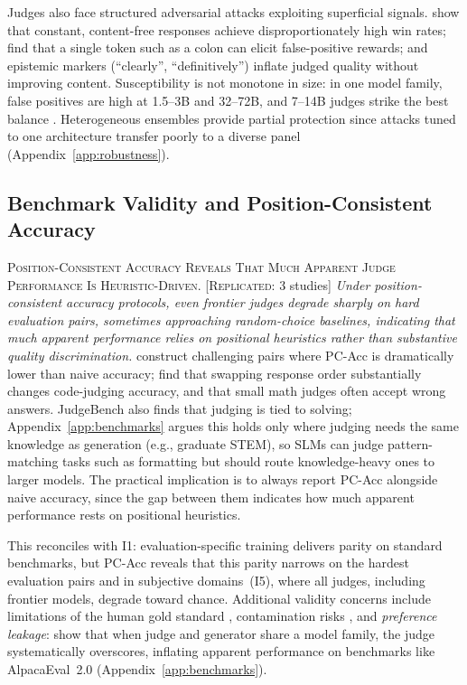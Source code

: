 \documentclass[11pt]{article}
\begin{document}
Judges also face structured adversarial attacks exploiting superficial signals. \citet{zheng2025cheating} show that constant, content-free responses achieve disproportionately high win rates; \citet{zhao2025one} find that a single token such as a colon can elicit false-positive rewards; and epistemic markers (``clearly'', ``definitively'') inflate judged quality without improving content. Susceptibility is not monotone in size: in one model family, false positives are high at 1.5--3B and 32--72B, and 7--14B judges strike the best balance \citep{zhao2025one}. Heterogeneous ensembles provide partial protection since attacks tuned to one architecture transfer poorly to a diverse panel (Appendix~\ref{app:robustness}).

\subsection{Benchmark Validity and Position-Consistent Accuracy}

\textsc{Position-Consistent Accuracy Reveals That Much Apparent Judge Performance Is Heuristic-Driven.} [\textsc{Replicated}: 3 studies] \textit{Under position-consistent accuracy protocols, even frontier judges degrade sharply on hard evaluation pairs, sometimes approaching random-choice baselines, indicating that much apparent performance relies on positional heuristics rather than substantive quality discrimination.} \citet{tan2025judgebench} construct challenging pairs where PC-Acc is dramatically lower than naive accuracy; \citet{jiang2025codejudgebench} find that swapping response order substantially changes code-judging accuracy, and \citet{bi2026judgeboard} that small math judges often accept wrong answers. JudgeBench also finds that judging is tied to solving; Appendix~\ref{app:benchmarks} argues this holds only where judging needs the same knowledge as generation (e.g., graduate STEM), so SLMs can judge pattern-matching tasks such as formatting but should route knowledge-heavy ones to larger models. The practical implication is to always report PC-Acc alongside naive accuracy, since the gap between them indicates how much apparent performance rests on positional heuristics.

This reconciles with I1: evaluation-specific training delivers parity on standard benchmarks, but PC-Acc reveals that this parity narrows on the hardest evaluation pairs and in subjective domains~(I5), where all judges, including frontier models, degrade toward chance. Additional validity concerns include limitations of the human gold standard \citep{shankar2024validates}, contamination risks \citep{bedemariam2025potential}, and \emph{preference leakage}: \citet{li2025preference} show that when judge and generator share a model family, the judge systematically overscores, inflating apparent performance on benchmarks like AlpacaEval~2.0 (Appendix~\ref{app:benchmarks}).
\end{document}
